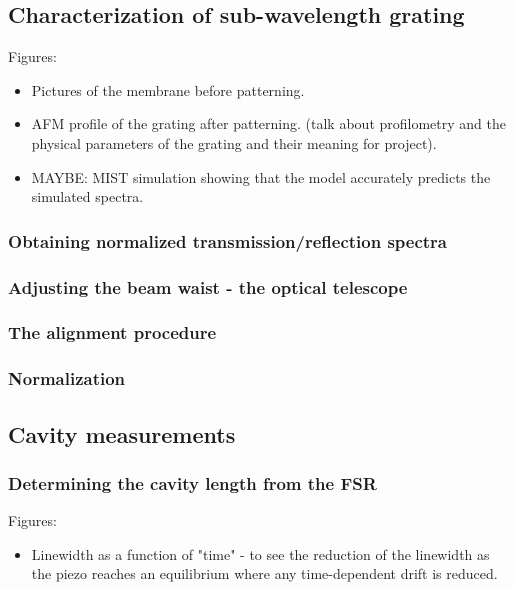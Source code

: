 \subsection{Characterization of sub-wavelength grating}

Figures:
\begin{itemize}
    \item Pictures of the membrane before patterning.
    \item AFM profile of the grating after patterning. (talk about profilometry and the physical parameters of the grating and their meaning for project).
    \item MAYBE: MIST simulation showing that the model accurately predicts the simulated spectra.
\end{itemize}

\subsubsection{Obtaining normalized transmission/reflection spectra}

\subsubsection{Adjusting the beam waist - the optical telescope}

\subsubsection{The alignment procedure}

\subsubsection{Normalization}

\subsection{Cavity measurements}

\subsubsection{Determining the cavity length from the FSR}

Figures: 
\begin{itemize}
    \item Linewidth as a function of "time" - to see the reduction of the linewidth as the piezo reaches an equilibrium where any time-dependent drift is reduced. 
\end{itemize}

